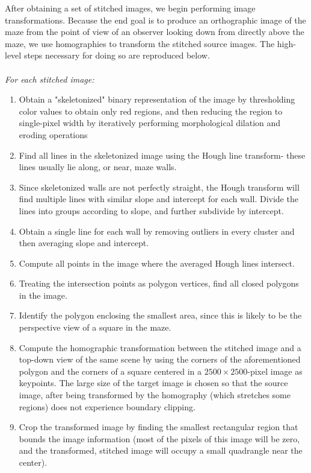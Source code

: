\documentclass[10pt,twocolumn,letterpaper]{article}
\begin{document}
After obtaining a set of stitched images, we begin performing image transformations.  Because the end goal is to produce
an orthographic image of the maze from the point of view of an observer looking down from directly above the maze, we
use homographies to transform the stitched source images.  The high-level steps necessary for doing so are reproduced
below.
\\
\\
\textit{For each stitched image:}
\begin{enumerate}
	\item Obtain a "skeletonized" binary representation of the image by thresholding color values to obtain only red
	regions, and then reducing the region to single-pixel width by iteratively performing morphological dilation and
	eroding operations
	\item Find all lines in the skeletonized image using the Hough line transform- these lines usually lie along, or
	near, maze walls.
	\item Since skeletonized walls are not perfectly straight, the Hough transform will find multiple lines with similar
	slope and intercept for each wall.  Divide the lines into groups according to slope, and further subdivide by
	intercept.
	\item Obtain a single line for each wall by removing outliers in every cluster and then averaging slope and
	intercept.
	\item Compute all points in the image where the averaged Hough lines intersect.
	\item Treating the intersection points as polygon vertices, find all closed polygons in the image.
	\item Identify the polygon enclosing the smallest area, since this is likely to be the perspective view of a square
	in the maze.
	\item Compute the homographic transformation between the stitched image and a top-down view of the same scene by
	using the corners of the aforementioned polygon and the corners of a square centered in a $2500\times 2500$-pixel
	image as keypoints.  The large size of the target image is chosen so that the source image, after being transformed
	by the homography (which stretches some regions) does not experience boundary clipping.
	\item Crop the transformed image by finding the smallest rectangular region that bounds the image information (most
	of the pixels of this image will be zero, and the transformed, stitched image will occupy a small quadrangle near
	the center).
\end{enumerate}
\end{document}
